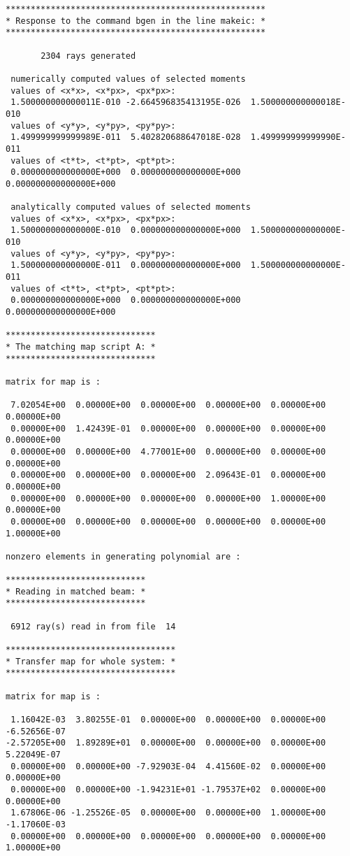 \begin{footnotesize}
\begin{verbatim}
****************************************************
* Response to the command bgen in the line makeic: *
****************************************************

       2304 rays generated

 numerically computed values of selected moments
 values of <x*x>, <x*px>, <px*px>:
 1.500000000000011E-010 -2.664596835413195E-026  1.500000000000018E-010
 values of <y*y>, <y*py>, <py*py>:
 1.499999999999989E-011  5.402820688647018E-028  1.499999999999990E-011
 values of <t*t>, <t*pt>, <pt*pt>:
 0.000000000000000E+000  0.000000000000000E+000  0.000000000000000E+000

 analytically computed values of selected moments
 values of <x*x>, <x*px>, <px*px>:
 1.500000000000000E-010  0.000000000000000E+000  1.500000000000000E-010
 values of <y*y>, <y*py>, <py*py>:
 1.500000000000000E-011  0.000000000000000E+000  1.500000000000000E-011
 values of <t*t>, <t*pt>, <pt*pt>:
 0.000000000000000E+000  0.000000000000000E+000  0.000000000000000E+000

******************************
* The matching map script A: *
******************************

matrix for map is :

 7.02054E+00  0.00000E+00  0.00000E+00  0.00000E+00  0.00000E+00  0.00000E+00
 0.00000E+00  1.42439E-01  0.00000E+00  0.00000E+00  0.00000E+00  0.00000E+00
 0.00000E+00  0.00000E+00  4.77001E+00  0.00000E+00  0.00000E+00  0.00000E+00
 0.00000E+00  0.00000E+00  0.00000E+00  2.09643E-01  0.00000E+00  0.00000E+00
 0.00000E+00  0.00000E+00  0.00000E+00  0.00000E+00  1.00000E+00  0.00000E+00
 0.00000E+00  0.00000E+00  0.00000E+00  0.00000E+00  0.00000E+00  1.00000E+00

nonzero elements in generating polynomial are :

****************************
* Reading in matched beam: *
****************************

 6912 ray(s) read in from file  14

**********************************
* Transfer map for whole system: *
**********************************

matrix for map is :

 1.16042E-03  3.80255E-01  0.00000E+00  0.00000E+00  0.00000E+00 -6.52656E-07
-2.57205E+00  1.89289E+01  0.00000E+00  0.00000E+00  0.00000E+00  5.22049E-07
 0.00000E+00  0.00000E+00 -7.92903E-04  4.41560E-02  0.00000E+00  0.00000E+00
 0.00000E+00  0.00000E+00 -1.94231E+01 -1.79537E+02  0.00000E+00  0.00000E+00
 1.67806E-06 -1.25526E-05  0.00000E+00  0.00000E+00  1.00000E+00 -1.17060E-03
 0.00000E+00  0.00000E+00  0.00000E+00  0.00000E+00  0.00000E+00  1.00000E+00


\end{verbatim}
\end{footnotesize}
